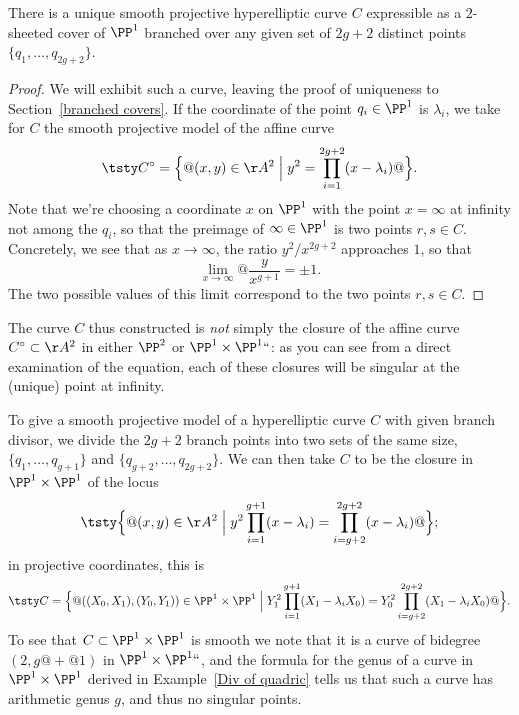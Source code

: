 \begin{theorem}
\label{hyperelliptic existence}
There is a unique smooth projective hyperelliptic curve $C$ expressible
%
as a
$2$-sheeted cover
%
of $\PP^1$ branched over any given set of $2g+2$
distinct points $\{q_{1}, \dots, q_{2g+2}\}$.
\unif
\end{theorem}

\begin{proof}
We
will exhibit
 such a curve,
leaving the proof of uniqueness to Section~\ref{branched covers}.
If the coordinate of the point $q_i \in \PP^1$ is $\lambda_i$,
we take for $C$
the smooth
projective model
\label{projective model}%
of the affine curve
  $$
 \tsty\let\big\Big
C^\circ = \big\{@(x,y) \in \AA^2 \bigm|  y^2 = \prod\limits_{i=1}^{2g+2}
(x - \lambda_i)@\big\}.
$$
Note that we're choosing a coordinate $x$ on $\PP^1$ with the point
$x = \infty$ at infinity not among the $q_i$, so that the preimage of
$\infty \in \PP^1$ is two points $r, s \in C$. Concretely, we see that
as $x \to \infty$, the ratio $y^2/x^{2g+2}$
approaches
$1$, so that
$$
\lim_{x \to \infty} @ \frac{y}{x^{g+1}}  =  \pm 1.
$$
  The two possible values of this limit correspond to the two points
  $r,s \in C$.
\end{proof}

The curve $C$
thus constructed
is \emph{not} simply the closure of the affine curve
$C^\circ \subset \AA^2$ in either $\PP^2$ or $\PP^1 \times \PP^1` `$: as
you can see from a direct examination of the equation, each of these
closures will be singular at the (unique) point at infinity.

To give a smooth projective model of
a
hyperelliptic curve $C$ with
given branch divisor, we divide the $2g+2$ branch points  into two sets
of the
same size,
 $\{q_1,\dots,q_{g+1}\}$ and $\{q_{g+2}, \dots,
q_{2g+2}\}$. We can then take $C$ to be the closure in $\PP^1 \times \PP^1$
of the  locus
  $$
 \tsty\let\big\Big
  \big\{@(x,y) \in \AA^2  \bigm|  y^2\prod\limits_{i=1}^{g+1} (x - \lambda_i)
  = \prod\limits_{i=g+2}^{2g+2} (x - \lambda_i)@\big\};
  $$
  in projective coordinates, this is
   $$
 \tsty\let\big\Big
  C  =  \big\{@((X_{0},X_{1}), (Y_{0},Y_{1})) \in \PP^1 \times
  \PP^1  \bigm|  Y_1^2\prod\limits_{i=1}^{g+1} (X_1 - \lambda_iX_0) =
  Y_0^2\prod\limits_{i=g+2}^{2g+2} (X_1 - \lambda_iX_0)@\big\}.
  $$
To see that $C \subset \PP^1 \times \PP^1$ is smooth we note that it is a
curve of
bidegree
%
$(2,g@{+}@1)$ in $\PP^1 \times \PP^1` `$, and the formula for
the genus of a curve in $\PP^1 \times \PP^1$ derived in
Example~\ref{Div of quadric} tells us that such a curve has
arithmetic genus $g$, and thus no singular points.

